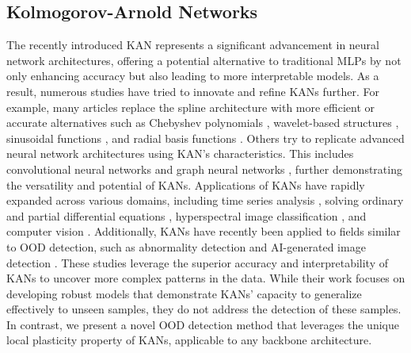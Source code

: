 \subsection{Kolmogorov-Arnold Networks}
\label{sec:kan_rel_works}

The recently introduced KAN \citep{hou2024comprehensivesurveykolmogorovarnold} represents a significant advancement in neural network architectures, offering a potential alternative to traditional MLPs by not only enhancing accuracy but also leading to more interpretable models.
As a result, numerous studies have tried to innovate and refine KANs further. 
For example, many articles replace the spline architecture with more efficient or accurate alternatives such as Chebyshev polynomials \citep{ss2024chebyshevpolynomialbasedkolmogorovarnoldnetworks}, wavelet-based structures \citep{bozorgasl2024wavkanwaveletkolmogorovarnoldnetworks}, sinusoidal functions \citep{reinhardt2024sinekankolmogorovarnoldnetworksusing}, and radial basis functions \citep{li2024kolmogorovarnoldnetworksradialbasis}. 
Others try to replicate advanced neural network architectures using KAN's characteristics. 
This includes convolutional neural networks \citep{bodner2024convolutionalkolmogorovarnoldnetworks} and graph neural networks \citep{kiamari2024gkangraphkolmogorovarnoldnetworks, bresson2024kagnnskolmogorovarnoldnetworksmeet, zhang2024graphkanenhancingfeatureextraction}, further demonstrating the versatility and potential of KANs. 
Applications of KANs have rapidly expanded across various domains, including time series analysis \citep{vacarubio2024kolmogorovarnoldnetworkskanstime, xu2024kolmogorovarnoldnetworkstimeseries}, solving ordinary and partial differential equations \citep{koenig2024kanodeskolmogorovarnoldnetworkordinary, wang2024kolmogorovarnoldinformedneural}, hyperspectral image classification \citep{seydi2024unveilingpowerwaveletswaveletbased, jamali2024learnmoreexploringkolmogorovarnold}, and computer vision \citep{azam2024suitabilitykanscomputervision, li2024ukanmakesstrongbackbone, cheon2024kolmogorovarnoldnetworksatelliteimage}. 
Additionally, KANs have recently been applied to fields similar to OOD detection, such as abnormality detection \citep{Huang2024.06.04.24308428} and AI-generated image detection \citep{anon2024detectingundetectablecombiningkolmogorovarnold}. 
These studies leverage the superior accuracy and interpretability of KANs \citep{liu2024kankolmogorovarnoldnetworks} to uncover more complex patterns in the data. 
While their work focuses on developing robust models that demonstrate KANs' capacity to generalize effectively to unseen samples, they do not address the detection of these samples. 
In contrast, we present a novel OOD detection method that leverages the unique local plasticity property of KANs, applicable to any backbone architecture.


